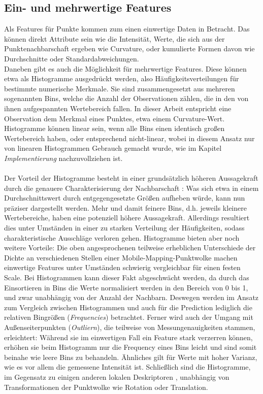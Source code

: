 \subsection{Ein- und mehrwertige Features}

Als Features für Punkte kommen zum einen einwertige Daten in Betracht. Das können direkt Attribute sein wie die Intensität, Werte, die sich aus der Punktenachbarschaft ergeben wie Curvature, oder kumulierte Formen davon wie Durchschnitte oder Standardabweichungen. \\
Daneben gibt es auch die Möglichkeit für mehrwertige Features. Diese können etwa als Histogramme ausgedrückt werden, also Häufigkeitsverteilungen für bestimmte numerische Merkmale. Sie sind zusammengesetzt aus mehreren sogenannten Bins, welche die Anzahl der Observationen zählen, die in den von ihnen aufgespannten Wertebereich fallen. In dieser Arbeit entspricht eine Observation dem Merkmal eines Punktes, etwa einem Curvature-Wert. Histogramme können linear sein, wenn alle Bins einen identisch großen Wertebereich haben, oder entsprechend nicht-linear, wobei in diesem Ansatz nur von linearen Histogrammen Gebrauch gemacht wurde, wie im Kapitel \textit{Implementierung} nachzuvollziehen ist. \\\\
Der Vorteil der Histogramme besteht in einer grundsätzlich höheren Aussagekraft durch die genauere Charakterisierung der Nachbarschaft \citep{Rusu.etal-2008}: Was sich etwa in einem Durchschnittswert durch entgegengesetzte Größen aufheben würde, kann nun präziser dargestellt werden. Mehr und damit feinere Bins, d.h. jeweils kleinere Wertebereiche, haben eine potenziell höhere Aussagekraft. Allerdings resultiert dies unter Umständen in einer zu starken Verteilung der Häufigkeiten, sodass charakteristische Ausschläge verloren gehen. Histogramme bieten aber noch weitere Vorteile: Die oben angesprochenen teilweise erheblichen Unterschiede der Dichte an verschiedenen Stellen einer Mobile-Mapping-Punktwolke machen einwertige Features unter Umständen schwierig vergleichbar für einen festen Scale. Bei Histogrammen kann dieser Fakt abgeschwächt werden, da durch das Einsortieren in Bins die Werte normalisiert werden in den Bereich von 0 bis 1, und zwar unabhängig von der Anzahl der Nachbarn. Deswegen werden im Ansatz zum Vergleich zwischen Histogrammen und auch für die Prediction lediglich die relativen Bingrößen (\textit{Frequencies}) betrachtet. Ferner wird auch der Umgang mit Außenseiterpunkten (\textit{Outliern}), die teilweise von Messungenauigkeiten stammen, erleichtert: Während sie im einwertigen Fall ein Feature stark verzerren können, erhöhen sie beim Histogramm nur die Frequency eines Bins leicht und sind somit beinahe wie leere Bins zu behandeln. Ähnliches gilt für Werte mit hoher Varianz, wie es vor allem die gemessene Intensität ist. Schließlich sind die Histogramme, im Gegensatz zu einigen anderen lokalen Deskriptoren \citep{Han.etal-2018}, unabhängig von Transformationen der Punktwolke wie Rotation oder Translation. \\
